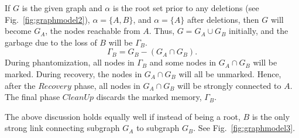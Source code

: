 If $G$ is the given graph and $\alpha$ is the root set prior to any deletions (see Fig.~\ref{fig:graphmodel2}), $\alpha = \{A, B\}$, and $\alpha = \{ A \}$ after deletions, then
$G$ will become $G_A$, the nodes reachable from $A$.
Thus, $G = G_A \cup G_B$  initially, and
the garbage due to the loss of  $B$ will be $\Gamma_B$.
$$\Gamma_B = G_B - (G_A \cap G_B).$$
During phantomization, all nodes in $\Gamma_B$ and some nodes in $G_A \cap G_B$ will be marked. During recovery, the nodes in $G_A \cap G_B$ will all be unmarked. Hence,
after the $Recovery$ phase, all nodes in $G_A \cap G_B$ will be strongly connected to $A$.
The final phase $CleanUp$ discards the marked memory, $\Gamma_B$.

The above discussion holds equally well if instead of being a root, $B$ is the only strong
link connecting subgraph $G_A$ to subgraph $G_B$. See Fig.~\ref{fig:graphmodel3}.










